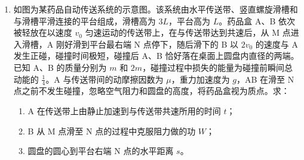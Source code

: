\documentclass[\gkver]{gaokaozhenti}
\begin{document}
\begin{enumerate}
{$\Phi = 2B_{0}h \cdot \frac{1}{2}h - B_{0}h \cdot \frac{1}{2}h = \frac{1}{2}B_{0}h^{2}$

方向垂直纸面向里；

（3）$2\tau \sim 3\tau$ 时间内，Ⅱ 区磁感应强度也线性减小到 0，则有

$E' = \frac{\Delta\Phi}{\Delta t} = \frac{B_{0}\frac{1}{2}h^{2}}{\tau} = \frac{B_{0}h^{2}}{2\tau}$

感应电流大小为

$I' = \frac{E'}{R} = \frac{B_{0}h^{2}}{2\tau R}$

则 $2\tau \sim 3\tau$ 时间内，线框中产生的热量为

$Q = I'^{2}Rt = \frac{B_{0}^{2}h^{4}}{4\tau R}$
}

\item
如图为某药品自动传送系统的示意图。该系统由水平传送带、竖直螺旋滑槽和与滑槽平滑连接的平台组成，滑槽高为 $3L$，平台高为 $L$。药品盒 A、B 依次被轻放在以速度 $v_{0}$ 匀速运动的传送带上，在与传送带达到共速后，从 M 点进入滑槽，A 刚好滑到平台最右端 N 点停下，随后滑下的 B 以 $2v_{0}$ 的速度与 A 发生正碰，碰撞时间极短，碰撞后 A、B 恰好落在桌面上圆盘内直径的两端。已知 A、B 的质量分别为 $m$ 和 $2m$，碰撞过程中损失的能量为碰撞前瞬间总动能的 $\frac{1}{4}$。A 与传送带间的动摩擦因数为 $\mu$，重力加速度为 $g$，AB 在滑至 N 点之前不发生碰撞，忽略空气阻力和圆盘的高度，将药品盒视为质点。求：

\begin{enumerate}
	\item
	A 在传送带上由静止加速到与传送带共速所用的时间 $t$；
	\item
	B 从 M 点滑至 N 点的过程中克服阻力做的功 $W$；
	\item
	圆盘的圆心到平台右端 N 点的水平距离 $s$。
\end{enumerate}


\end{enumerate}
\end{document}
